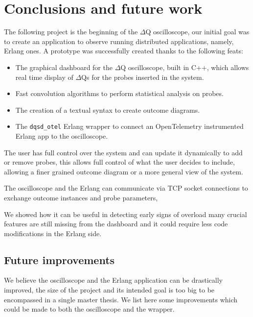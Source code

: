 \chapter{Conclusions and future work}
The following project is the beginning of the $\Delta$Q oscilloscope, our initial goal was to create an application to observe running distributed applications, namely, Erlang ones.
    A prototype was successfully created thanks to the following feats:
    \begin{itemize}
        \item The graphical dashboard for the $\Delta$Q oscilloscope, built in C++, which allows real time display of $\Delta$Qs for the probes inserted in the system.
        \item Fast convolution algorithms to perform statistical analysis on probes.
        \item The creation of a textual syntax to create outcome diagrams.
        \item The \texttt{dqsd\_otel} Erlang wrapper to connect an OpenTelemetry instrumented Erlang app to the oscilloscope.
    \end{itemize}
    The user has full control over the system and can update it dynamically to add or remove probes, this allows full control of what the user decides to include, allowing a finer grained outcome diagram or a more general view of the system.  

    The oscilloscope and the Erlang can communicate via TCP socket connections to exchange outcome instances and probe parameters,

    We showed how it can be useful in detecting early signs of overload many crucial features are still missing from the dashboard and it could require less code modifications in the Erlang side. 

    \section{Future improvements}
        We believe the oscilloscope and the Erlang application can be drastically improved, the size of the project and its intended goal is too big to be encompassed in a single master thesis. We list here some improvements which could be made to both the oscilloscope and the wrapper.
